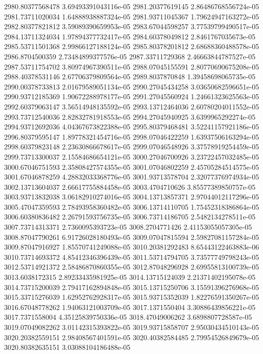 {2980.80377568478 3.69493391043116e-05
2981.20377619145 2.86486768556724e-05
2981.73711020034 1.64888938887324e-05
2981.93711045367 1.79624947163272e-05
2982.80377821812 3.59089390659953e-05
2983.67044598257 3.77539799490517e-05
2984.13711324034 1.97894377732417e-05
2984.60378049812 2.8461767035673e-05
2985.53711501368 2.99866127188124e-05
2985.80378201812 2.68688360488578e-05
2986.8704500359 2.73484899377576e-05
2987.33711729368 2.46663844787527e-05
2987.53711754702 3.80974967390511e-05
2988.07045155591 2.80770690675208e-05
2988.40378531146 2.67706379809564e-05
2989.8037870848 1.39458698065735e-05
2990.00378733813 2.01679589051134e-05
2990.27045434258 3.03650682596651e-05
2990.93712185369 1.90672288978177e-05
2991.27045560924 1.24661323625563e-05
2992.60379063147 3.56514948135592e-05
2993.13712464036 2.60780204011552e-05
2993.73712540036 2.82832781918553e-05
2994.27045940925 3.6399965292274e-05
2994.93712692036 4.04367673822388e-05
2995.80379468481 3.52241157921186e-05
2996.80379595147 1.89778321454716e-05
2998.07046422259 1.63937506163294e-05
2998.60379823148 2.23630866678617e-05
2999.07046548926 3.37578919254459e-05
2999.73713300037 2.15584686654121e-05
3000.27046700926 3.23722457032485e-05
3000.67046751593 2.35808427574355e-05
3001.07046802259 2.45705284514575e-05
3001.67046878259 4.28832033368776e-05
3001.93713578704 2.32077376974934e-05
3002.13713604037 2.66617755884458e-05
3003.4704710626 3.85577389850757e-05
3003.93713832038 3.06182910274016e-05
3004.13713857371 2.97044012117296e-05
3005.47047359593 2.78493958360482e-05
3006.13714110705 1.75452318386864e-05
3006.60380836482 2.26791593756735e-05
3006.73714186705 2.5482134278511e-05
3007.73714313371 2.7360095393723e-05
3008.2704771426 2.41153055057305e-05
3008.87047790261 6.91726028180493e-05
3009.07047815594 2.59827081157284e-05
3009.87047916927 1.85570741249088e-05
3010.20381292483 8.65443122463883e-06
3010.73714693372 4.85412346396439e-05
3011.53714794705 3.73577749798243e-05
3012.53714921372 2.58486870860355e-05
3012.87048296928 2.69955813100739e-05
3013.6038172315 2.89233435981925e-05
3014.13715124039 2.21371402195078e-05
3014.73715200039 2.79417162894848e-05
3015.13715250706 3.15591396276968e-05
3015.33715276039 1.62952762928317e-05
3015.93715352039 1.82276591350267e-05
3016.67048778262 1.94063121003709e-05
3017.1371550404 3.30886439856221e-05
3017.7371558004 4.35125839750336e-05
3018.47049006262 3.6898807728587e-05
3019.07049082262 3.01142315393822e-05
3019.93715858707 2.95030434510143e-05
3020.20382559151 2.98408567401591e-05
3020.40382584485 2.79954526849679e-05
3020.80382635151 3.03088104186488e-05
}
